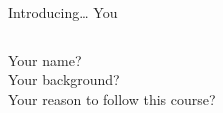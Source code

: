 \documentclass{beamer}
\begin{document}
\begin{frame}{Introducing\ldots}
	{\huge{You}}
	\small{}
	\begin{columns}
		Your name?\\
		Your background?\\
		Your reason to follow this course?
	\end{columns}
\end{frame}
\end{document}
